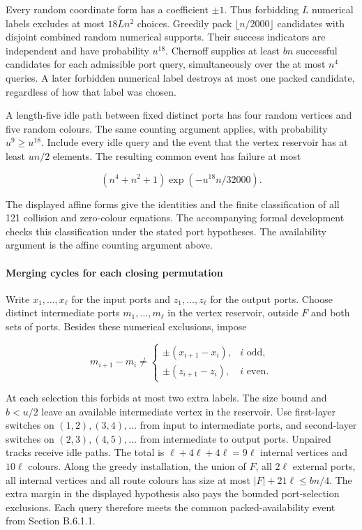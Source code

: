\documentclass[11pt,a4paper]{article}
\begin{document}
Every random coordinate form has a coefficient \(\pm1\). Thus forbidding \(L\) numerical labels excludes at most \(18Ln^2\) choices. Greedily pack \(\lfloor n/2000\rfloor\) candidates with disjoint combined random numerical supports. Their success indicators are independent and have probability \(u^{18}\). Chernoff supplies at least \(bn\) successful candidates for each admissible port query, simultaneously over the at most \(n^4\) queries. A later forbidden numerical label destroys at most one packed candidate, regardless of how that label was chosen.

A length-five idle path between fixed distinct ports has four random vertices and five random colours. The same counting argument applies, with probability \(u^9\ge u^{18}\). Include every idle query and the event that the vertex reservoir has at least \(un/2\) elements. The resulting common event has failure at most

\[
(n^4+n^2+1)\exp(-u^{18}n/32000).
\]

The displayed affine forms give the identities and the finite classification of all 121 collision and zero-colour equations. The accompanying formal development checks this classification under the stated port hypotheses. The availability argument is the affine counting argument above.

\hypertarget{merging-cycles-for-each-closing-permutation}{%
\paragraph{Merging cycles for each closing permutation}\label{merging-cycles-for-each-closing-permutation}}

Write \(x_1,\ldots,x_\ell\) for the input ports and \(z_1,\ldots,z_\ell\) for the output ports. Choose distinct intermediate ports \(m_1,\ldots,m_\ell\) in the vertex reservoir, outside \(F\) and both sets of ports. Besides these numerical exclusions, impose

\[
m_{i+1}-m_i\ne
\begin{cases}
\pm(x_{i+1}-x_i),&i\text{ odd},\\
\pm(z_{i+1}-z_i),&i\text{ even}.
\end{cases}
\]

At each selection this forbids at most two extra labels. The size bound and \(b<u/2\) leave an available intermediate vertex in the reservoir. Use first-layer switches on \((1,2),(3,4),\ldots\) from input to intermediate ports, and second-layer switches on \((2,3),(4,5),\ldots\) from intermediate to output ports. Unpaired tracks receive idle paths. The total is \(\ell+4\ell+4\ell=9\ell\) internal vertices and \(10\ell\) colours. Along the greedy installation, the union of \(F\), all \(2\ell\) external ports, all internal vertices and all route colours has size at most \(|F|+21\ell\le bn/4\). The extra margin in the displayed hypothesis also pays the bounded port-selection exclusions. Each query therefore meets the common packed-availability event from Section B.6.1.1.
\end{document}
